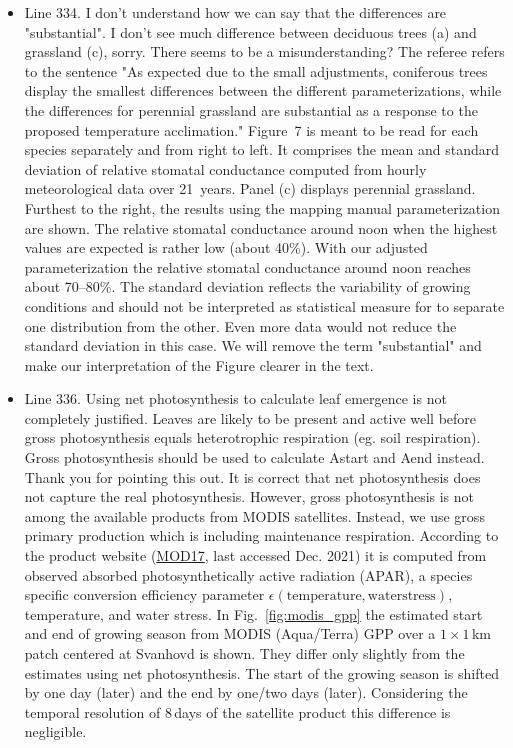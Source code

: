 \documentclass{scrartcl}
\begin{document}
\begin{itemize}
\item {\color{blue}Line 334. I don't understand how we can say that the differences are "substantial". I don't see much difference between deciduous trees (a) and grassland (c), sorry.}
There seems to be a misunderstanding? The referee refers to the sentence "As expected due to the small adjustments, coniferous trees display the smallest differences between the different parameterizations, while the differences for perennial grassland are substantial as a response to the proposed temperature acclimation." Figure~7 is meant to be read for each species separately and from right to left. It comprises the mean and standard deviation of relative stomatal conductance computed from hourly meteorological data over 21~years. Panel (c) displays perennial grassland. Furthest to the right, the results using the mapping manual parameterization are shown. The relative stomatal conductance around noon when the highest values are expected is rather low (about 40\%). With our adjusted parameterization the relative stomatal conductance around noon reaches about 70--80\%. The standard deviation reflects the variability of growing conditions and should not be interpreted as statistical measure for to separate one distribution from the other. Even more data would not reduce the standard deviation in this case.
We will remove the term "substantial" and make our interpretation of the Figure clearer in the text. 

\item {\color{blue}Line 336. Using net photosynthesis to calculate leaf emergence is not completely justified. Leaves are likely to be present and active well before gross photosynthesis equals heterotrophic respiration (eg. soil respiration). Gross photosynthesis should be used to calculate Astart and Aend instead.}
Thank you for pointing this out. It is correct that net photosynthesis does not capture the real photosynthesis. However, gross photosynthesis is not among the available products from MODIS satellites. Instead, we use gross primary production which is including maintenance respiration. According to the product website (\href{http://www.ntsg.umt.edu/project/modis/mod17.php}{MOD17}, last accessed Dec. 2021) it is computed from observed absorbed photosynthetically active radiation (APAR), a species specific conversion efficiency parameter $\epsilon(\mathrm{temperature, water stress})$, temperature, and water stress. In Fig.~\ref{fig:modis_gpp} the estimated start and end of growing season from MODIS (Aqua/Terra) GPP over a $1\times 1$\,km patch centered at Svanhovd is shown. They differ only slightly from the estimates using net photosynthesis. The start of the growing season is shifted by one day (later) and the end by one/two days (later). Considering the temporal resolution of 8\,days of the satellite product this difference is negligible. 


\end{itemize}
\end{document}
